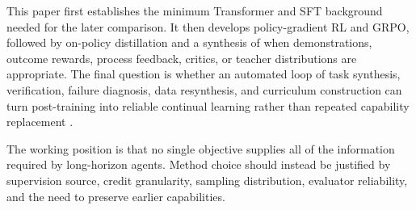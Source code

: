 This paper first establishes the minimum Transformer and SFT background needed for the
later comparison. It then develops policy-gradient RL and GRPO, followed by on-policy
distillation and a synthesis of when demonstrations, outcome rewards, process feedback,
critics, or teacher distributions are appropriate. The final question is whether an
automated loop of task synthesis, verification, failure diagnosis, data resynthesis, and
curriculum construction can turn post-training into reliable continual learning rather
than repeated capability replacement \citep{shenfeld2026selfdistillation}.

The working position is that no single objective supplies all of the information required
by long-horizon agents. Method choice should instead be justified by supervision source,
credit granularity, sampling distribution, evaluator reliability, and the need to preserve
earlier capabilities.
